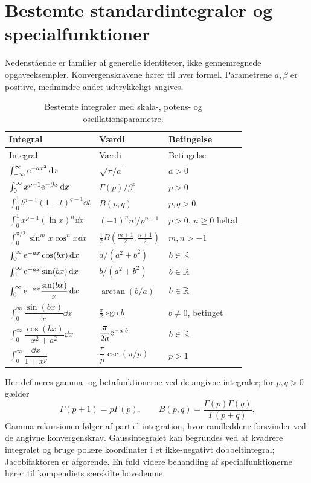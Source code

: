\section{Bestemte standardintegraler og specialfunktioner}
\label{sec:bestemte-standardintegraler}
Nedenstående er familier af generelle identiteter, ikke gennemregnede
opgaveeksempler. Konvergenskravene hører til hver formel. Parametrene
$a,\beta$ er positive, medmindre andet udtrykkeligt angives.
\begin{longtable}{@{}p{}p{}p{}@{}}
\caption{Bestemte integraler med skala-, potens- og oscillationsparametre.}\\
\toprule Integral & Værdi & Betingelse\\\midrule\endfirsthead
\toprule Integral & Værdi & Betingelse\\\midrule\endhead
$\int_{-\infty}^{\infty}\mathrm{e}^{-ax^2}\mathop{}\!\mathrm{d} x$ & $\sqrt{\pi/a}$ & $a>0$\\[2mm]
$\int_0^\infty x^{p-1}\mathrm{e}^{-\beta x}\mathop{}\!\mathrm{d} x$ & $\Gamma(p)/\beta^p$ & $p>0$\\[2mm]
$\int_0^1t^{p-1}(1-t)^{q-1}\dd t$ & $B(p,q)$ & $p,q>0$\\[2mm]
$\int_0^1x^{p-1}(\ln x)^n\dd x$ & $(-1)^n n!/p^{n+1}$ & $p>0$, $n\ge0$ heltal\\[2mm]
$\int_0^{\pi/2}\sin^m x\cos^n x\dd x$ & $\tfrac12 B(\tfrac{m+1}2,\tfrac{n+1}2)$ & $m,n>-1$\\[2mm]
$\int_0^\infty\mathrm{e}^{-ax}\cos(bx)\mathop{}\!\mathrm{d} x$ & $a/(a^2+b^2)$ & $b\in\mathbb{R}$\\[2mm]
$\int_0^\infty\mathrm{e}^{-ax}\sin(bx)\mathop{}\!\mathrm{d} x$ & $b/(a^2+b^2)$ & $b\in\mathbb{R}$\\[2mm]
$\int_0^\infty\mathrm{e}^{-ax}\dfrac{\sin(bx)}x\mathop{}\!\mathrm{d} x$ & $\arctan(b/a)$ & $b\in\mathbb{R}$\\[3mm]
$\int_0^\infty\dfrac{\sin(bx)}x\dd x$ & $\tfrac\pi2\operatorname{sgn}b$ & $b\ne0$, betinget\\[3mm]
$\int_0^\infty\dfrac{\cos(bx)}{x^2+a^2}\dd x$ & $\dfrac\pi{2a}\mathrm{e}^{-a|b|}$ & $b\in\mathbb{R}$\\[3mm]
$\int_0^\infty\dfrac{\dd x}{1+x^p}$ & $\dfrac\pi p\csc(\pi/p)$ & $p>1$\\
\bottomrule
\end{longtable}
Her defineres gamma- og betafunktionerne ved de angivne integraler;
for $p,q>0$ gælder
\[
 \Gamma(p+1)=p\Gamma(p),\qquad
 B(p,q)=\frac{\Gamma(p)\Gamma(q)}{\Gamma(p+q)}.
\]
Gamma-rekursionen følger af partiel integration, hvor randleddene
forsvinder ved de angivne konvergenskrav. Gaussintegralet kan begrundes
ved at kvadrere integralet og bruge polære koordinater i et ikke-negativt
dobbeltintegral; Jacobifaktoren er afgørende. En fuld videre behandling
af specialfunktionerne hører til kompendiets særskilte hovedemne.

